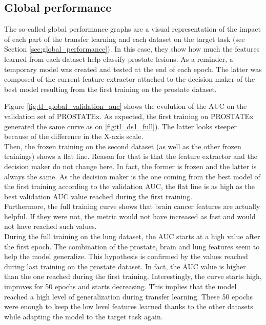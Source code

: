 \subsection{Global performance}
The so-called global performance graphs are a visual representation of the impact of each part of the transfer learning and each dataset on the target task (see Section \ref{sec:global_performance}). In this case, they show how much the features learned from each dataset help classify prostate lesions. As a reminder, a temporary model was created and tested at the end of each epoch. The latter was composed of the current feature extractor attached to the decision maker of the best model resulting from the first training on the prostate dataset.

Figure \ref{fig:tl_global_validation_auc} shows the evolution of the AUC on the validation set of PROSTATEx. As expected, the first training on PROSTATEx generated the same curve as on \ref{fig:tl_ds1_full}). The latter looks steeper because of the difference in the X-axis scale.\\
Then, the frozen training on the second dataset (as well as the other frozen trainings) shows a flat line. Reason for that is that the feature extractor and the decision maker do not change here. In fact, the former is frozen and the latter is always the same. As the decision maker is the one coming from the best model of the first training according to the validation AUC, the flat line is as high as the best validation AUC value reached during the first training. \\
Furthermore, the full training curve shows that brain cancer features are actually helpful. If they were not, the metric would not have increased as fast and would not have reached such values.\\
During the full training on the lung dataset, the AUC starts at a high value after the first epoch. The combination of the prostate, brain and lung features seem to help the model generalize. This hypothesis is confirmed by the values reached during last training on the prostate dataset. In fact, the AUC value is higher than the one reached during the first training. Interestingly, the curve starts high, improves for 50 epochs and starts decreasing. This implies that the model reached a high level of generalization during transfer learning. These 50 epochs were enough to keep the low level features learned thanks to the other datasets while adapting the model to the target task again. 



